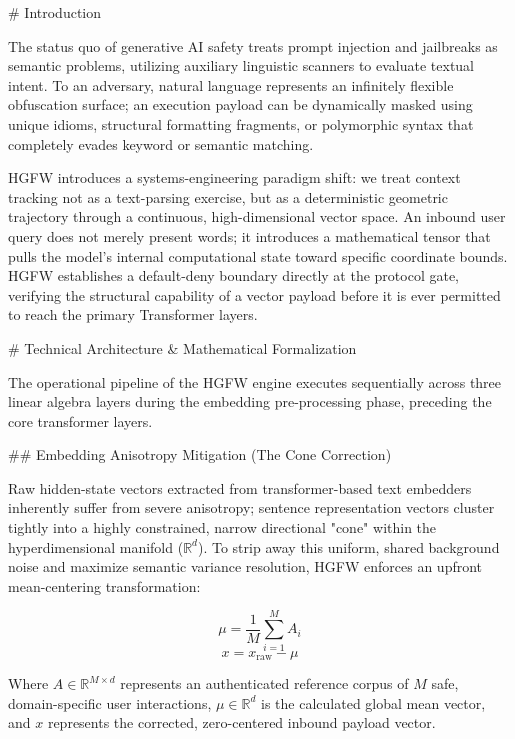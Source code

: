 # Introduction

The status quo of generative AI safety treats prompt injection and
jailbreaks as semantic problems, utilizing auxiliary linguistic scanners
to evaluate textual intent. To an adversary, natural language represents
an infinitely flexible obfuscation surface; an execution payload can be
dynamically masked using unique idioms, structural formatting fragments,
or polymorphic syntax that completely evades keyword or semantic
matching.

HGFW introduces a systems-engineering paradigm shift: we treat context
tracking not as a text-parsing exercise, but as a deterministic
geometric trajectory through a continuous, high-dimensional vector
space. An inbound user query does not merely present words; it
introduces a mathematical tensor that pulls the model's internal
computational state toward specific coordinate bounds. HGFW establishes
a default-deny boundary directly at the protocol gate, verifying the
structural capability of a vector payload before it is ever permitted to
reach the primary Transformer layers.

# Technical Architecture & Mathematical Formalization

The operational pipeline of the HGFW engine executes sequentially across
three linear algebra layers during the embedding pre-processing phase,
preceding the core transformer layers.

## Embedding Anisotropy Mitigation (The Cone Correction)

Raw hidden-state vectors extracted from transformer-based text embedders
inherently suffer from severe anisotropy; sentence representation
vectors cluster tightly into a highly constrained, narrow directional
"cone" within the hyperdimensional manifold ($\mathbb{R}^d$). To strip
away this uniform, shared background noise and maximize semantic
variance resolution, HGFW enforces an upfront mean-centering
transformation:

$$\begin{equation}
\mu = \frac{1}{M}\sum_{i=1}^{M} A_i
\end{equation}$$ $$\begin{equation}
x = x_{\text{raw}} - \mu
\end{equation}$$

Where $A \in \mathbb{R}^{M \times d}$ represents an authenticated
reference corpus of $M$ safe, domain-specific user interactions,
$\mu \in \mathbb{R}^d$ is the calculated global mean vector, and $x$
represents the corrected, zero-centered inbound payload vector.

